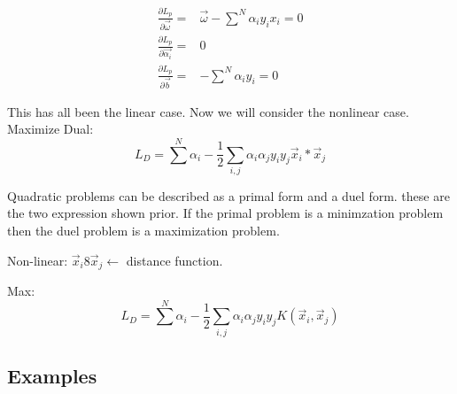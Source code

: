 \documentclass[letterpaper, 9pt]{article}
\begin{document}
\begin{equation}
\begin{split}
\frac{\partial L_p}{\partial \vec{\omega}} =& \vec{\omega} - \sum^N \alpha_i y_i x_i = 0 \\
\frac{\partial L_p}{\partial \vec{\alpha_i}} =& 0 \\
\frac{\partial L_p}{\partial \vec{b}} =& -\sum^N \alpha_i y_i = 0
\end{split}
\end{equation}

This has all been the linear case. Now we will consider the nonlinear case.
Maximize Dual:
\begin{equation}
L_D = \sum^N \alpha_i - \frac{1}{2} \sum_{i,j} \alpha_i \alpha_j y_i y_j \vec{x}_i * \vec{x}_j
\end{equation}

Quadratic problems can be described as a primal form and a duel form. these are the two expression shown prior. If the primal problem is a minimzation problem then the duel problem is a maximization problem.

Non-linear: $\vec{x}_i 8 \vec{x}_j \leftarrow$ distance function. 

Max:
\begin{equation}
L_D = \sum^N \alpha_i - \frac{1}{2} \sum_{i,j} \alpha_i \alpha_j y_i y_j K(\vec{x}_i,\vec{x}_j)
\end{equation}

\subsection{Examples}
\end{document}
